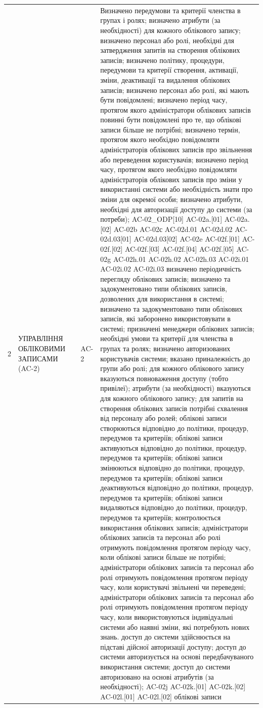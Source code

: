 \documentclass[10pt]{article}
\begin{document}
\begin{longtable}{|c|>{\raggedright\arraybackslash}p{2.5cm}|>{\raggedright\arraybackslash}p{4.5cm}|>{\raggedright\arraybackslash}p{3cm}|>{\raggedright\arraybackslash}p{4.5cm}|}
2 & УПРАВЛІННЯ ОБЛІКОВИМИ ЗАПИСАМИ (AC-2) &  & AC-2 & Визначено передумови та критерії членства в групах і ролях; визначено атрибути (за необхідності) для кожного облікового запису; визначено персонал або ролі, необхідні для затвердження запитів на створення облікових записів; визначено політику, процедури, передумови та критерії створення, активації, зміни, деактивації та видалення облікових записів; визначено персонал або ролі, які мають бути повідомлені; визначено період часу, протягом якого адміністратори облікових записів повинні бути повідомлені про те, що облікові записи більше не потрібні; визначено термін, протягом якого необхідно повідомляти адміністраторів облікових записів про звільнення або переведення користувачів; визначено період часу, протягом якого необхідно повідомляти адміністраторів облікових записів про зміни у використанні системи або необхідність знати про зміни для окремої особи; визначено атрибути, необхідні для авторизації доступу до системи (за потреби); AC-02\_\allowbreak{}ODP[10] AC-02a.[01] AC-02a.[02] AC-02b AC-02с AC-02d.01 AC-02d.02 AC-02d.03[01] AC-02d.03[02] AC-02e AC-02f.[01] AC-02f.[02] AC-02f.[03] AC-02f.[04] AC-02f.[05] AC-02g AC-02h.01 AC-02h.02 AC-02h.03 AC-02i.01 AC-02i.02 AC-02i.03 визначено періодичність перегляду облікових записів; визначено та задокументовано типи облікових записів, дозволених для використання в системі; визначено та задокументовано типи облікових записів, які заборонено використовувати в системі; призначені менеджери облікових записів; необхідні умови та критерії для членства в групах та ролях; визначено авторизованих користувачів системи; вказано приналежність до групи або ролі; для кожного облікового запису вказуються повноваження доступу (тобто привілеї); атрибути (за необхідності) вказуються для кожного облікового запису; для запитів на створення облікових записів потрібні схвалення від персоналу або ролей; облікові записи створюються відповідно до політики, процедур, передумов та критеріїв; облікові записи активуються відповідно до політики, процедур, передумов та критеріїв; облікові записи змінюються відповідно до політики, процедур, передумов та критеріїв; облікові записи деактивуються відповідно до політики, процедур, передумов та критеріїв; облікові записи видаляються відповідно до політики, процедур, передумов та критеріїв; контролюється використання облікових записів; адміністратори облікових записів та персонал або ролі отримують повідомлення протягом періоду часу, коли облікові записи більше не потрібні; адміністратори облікових записів та персонал або ролі отримують повідомлення протягом періоду часу, коли користувачі звільнені чи переведені; адміністратори облікових записів та персонал або ролі отримують повідомлення протягом періоду часу, коли використовуються індивідуальні системи або наявні зміни, які потребують нових знань. доступ до системи здійснюється на підставі дійсної авторизації доступу; доступ до системи авторизується на основі передбачуваного використання системи; доступ до системи авторизовано на основі атрибутів (за необхідності); AC-02j AC-02k.[01] AC-02k.[02] AC-02l.[01] AC-02l.[02] облікові записи 
\end{longtable}
\end{document}
